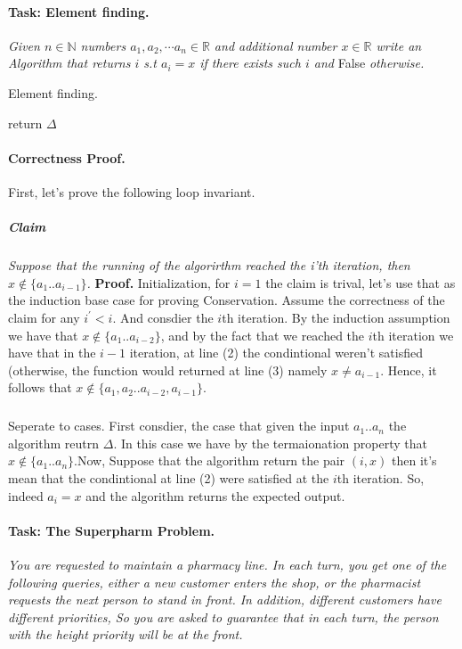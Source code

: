 \paragraph{Task: Element finding.}  \textit{Given $n\in \mathbb{N}$ numbers $a_1, a_2, \cdots a_n \in \mathbb{R}$ and additional number $x \in \mathbb{R}$ write an Algorithm that returns $i$ s.t $a_{i} = x$ if there exists such $i$ and} False \textit{otherwise.} 

\begin{algbox}{Element finding.}
\begin{algorithm}[H]
{}
  { 
    } 
    return \( \Delta \) 
\end{algorithm}
\end{algbox}
\paragraph{Correctness Proof.} First, let's prove the following loop invariant. 
\subparagraph{Claim} \textit{Suppose that the running of the algorirthm reached the i'th iteration, then $x \notin \{ a_{1} .. a_{i-1} \}$.} 
\textbf{Proof.} Initialization, for $i=1$ the claim is trival, let's use that as the induction base case for proving Conservation. Assume the correctness of the claim for any $i^{\prime} < i$. And consdier the $i$th iteration. By the induction assumption we have that $x \notin \{a_1 .. a_{i-2} \} $, and by the fact that we reached the $i$th iteration we have that in the $i-1$ iteration, at line (2) the condintional weren't satisfied (otherwise, the function would returned at line (3) namely $x \neq a_{i-1}$. Hence, it follows that $ x \notin \{ a_1, a_2 .. a_{i-2}, a_{i-1} \} $.     
  \subparagraph{} Seperate to cases. First consdier, the case that given the input $a_1 .. a_n$ the algorithm reutrn $\Delta$. In this case we have by the termaionation property that $x \notin \{ a_1 .. a_n \} $.Now, Suppose that the algorithm return the pair $\left( i, x \right)$ then it's mean that the condintional at line (2) were satisfied at the $i$th iteration. So, indeed $a_{i} = x$ and the algorithm returns the expected output.        



\paragraph{Task: The Superpharm Problem.}\textit{You are requested to maintain a pharmacy line. In each turn, you get one of the following queries, either a new customer enters the shop, or the pharmacist requests the next person to stand in front. In addition, different customers have different priorities, So you are asked to guarantee that in each turn, the person with the height priority will be at the front.}

